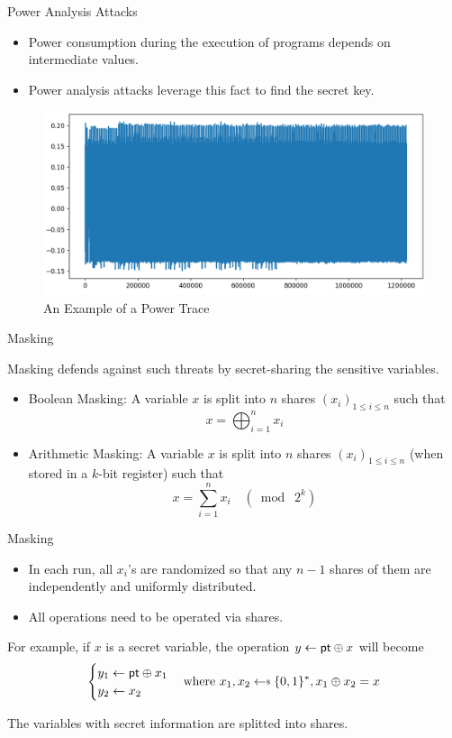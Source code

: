 \begin{frame}{Power Analysis Attacks}

\begin{itemize}
\item Power consumption during the execution of programs depends on intermediate values.
\pause
\item Power analysis attacks leverage this fact to find the secret key. 
\pause
\end{itemize}
\vspace{-4pt}
\begin{figure}
\includegraphics[width=.7\textwidth]{Figure/trace_example_ECC.png}
\vspace{-5pt}
\caption{An Example of a Power Trace}
\end{figure}

\end{frame}



\begin{frame}{Masking}

Masking defends against such threats by secret-sharing the sensitive variables.
\pause
\begin{itemize}
	\item Boolean Masking: A variable $x$ is split into $n$ shares $(x_i)_{1 \leq i \leq n}$ such that
	\[
	x = \bigoplus_{i=1}^n x_i
	\]
	\pause
	\item Arithmetic Masking: A variable $x$ is split into $n$ shares $(x_i)_{1 \leq i \leq n}$ (when stored in a $k$-bit register) such that
	\[
	x = \sum_{i=1}^n x_i \quad (\bmod\; 2^k)
	\]
\end{itemize}

\end{frame}


\begin{frame}{Masking}

\begin{itemize}
\item In each run, all $x_i$'s are randomized so that any $n-1$ shares of them are independently and uniformly distributed.
\pause
\item All operations need to be operated via shares.
\end{itemize}
\pause
For example, if $x$ is a secret variable, the operation $y \gets {\sf pt} \oplus x$ will become 
\[
	\begin{cases} y_1 \gets {\sf pt} \oplus x_1 \\ y_2 \gets x_2  \end{cases} \text{where } x_1,x_2 \getsdollar \{0,1\}^*, x_1 \oplus x_2 = x
\]

The variables with secret information are splitted into shares.

\end{frame}


